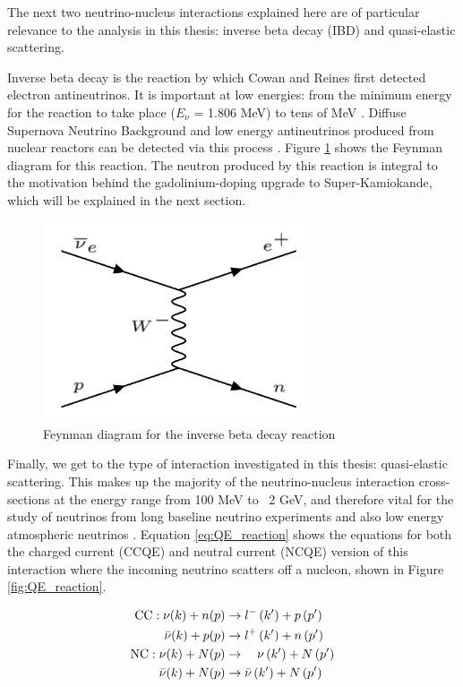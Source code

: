 The next two neutrino-nucleus interactions explained here are of particular relevance to the analysis in this thesis: inverse beta decay (IBD) and quasi-elastic scattering. 

Inverse beta decay is the reaction by which Cowan and Reines first detected electron antineutrinos. It is important at low energies: from the minimum energy for the reaction to take place ($E_{\nu}$ = 1.806 MeV) to tens of MeV \cite{oralbaev2016inverse}. Diffuse Supernova Neutrino Background and low energy antineutrinos produced from nuclear reactors can be detected via this process \cite{li2022prospects}. Figure \ref{fig:IBD_feynman} shows the Feynman diagram for this reaction. The neutron produced by this reaction is integral to the motivation behind the gadolinium-doping upgrade to Super-Kamiokande, which will be explained in the next section.

\begin{figure}
    \centering
    \includegraphics[width=0.7\textwidth]{Figures/IBD_feynman.png}
    \caption{Feynman diagram for the inverse beta decay reaction}
    \label{fig:IBD_feynman}
\end{figure}

Finally, we get to the type of interaction investigated in this thesis: quasi-elastic scattering. This makes up the majority of the neutrino-nucleus interaction cross-sections at the energy range from 100 MeV to ~2 GeV, and therefore vital for the study of neutrinos from long baseline neutrino experiments and also low energy atmospheric neutrinos \cite{wan2019measurement}. Equation \ref{eq:QE_reaction} shows the equations for both the charged current (CCQE) and neutral current (NCQE) version of this interaction where the incoming neutrino scatters off a nucleon, shown in Figure \ref{fig:QE_reaction}.


\begin{align} 
\mathrm{CC}: \nu(k)+n(p) & \rightarrow l^{-}\left(k^{\prime}\right)+p\left(p^{\prime}\right) \label{eq:QE_reaction}\\
\bar{\nu}(k)+p(p) & \rightarrow l^{+}\left(k^{\prime}\right)+n\left(p^{\prime}\right) \notag\\
\mathrm{NC}: \nu(k)+N(p) & \rightarrow \quad \nu\left(k^{\prime}\right)+N\left(p^{\prime}\right) \notag \\
\bar{\nu}(k)+N(p) & \rightarrow \bar{\nu}\left(k^{\prime}\right)+N\left(p^{\prime}\right) \notag 
\end{align}



